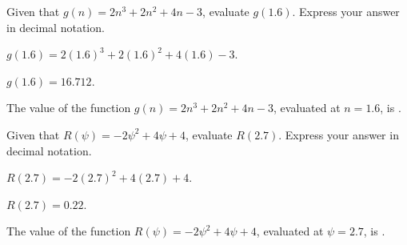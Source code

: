 \begin{shuffle}
\begin{exercise}
Given that $g(n)=2 n^3+2 n^2+4 n-3$, evaluate $g(1.6)$. Express your answer in decimal notation.
\begin{solution}
\begin{hint}
$g(1.6)=2 (1.6)^3+2 (1.6)^2+4 (1.6)-3$.
\end{hint}
\begin{hint}
$g(1.6)=16.712$.
\end{hint}
The value of the function $g(n)=2 n^3+2 n^2+4 n-3$, evaluated at $n=1.6$, is .
\end{solution}
\end{exercise}

\begin{exercise}
Given that $R(\psi)=-2 \psi ^2+4 \psi +4$, evaluate $R(2.7)$. Express your answer in decimal notation.
\begin{solution}
\begin{hint}
$R(2.7)=-2 (2.7) ^2+4 (2.7) +4$.
\end{hint}
\begin{hint}
$R(2.7)=0.22$.
\end{hint}
The value of the function $R(\psi)=-2 \psi ^2+4 \psi +4$, evaluated at $\psi=2.7$, is .
\end{solution}
\end{exercise}
\end{shuffle}




